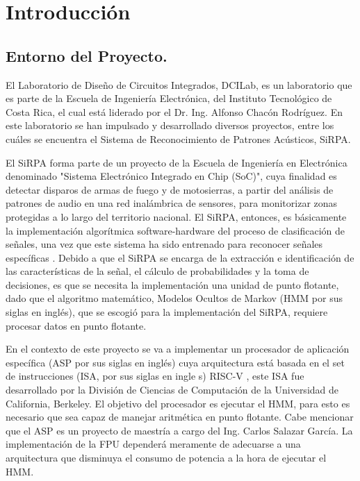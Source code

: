 
\chapter{Introducción}
\label{chp:intro}

\section{Entorno del Proyecto.}

El Laboratorio de Diseño de Circuitos Integrados, DCILab, es un laboratorio que es parte de la Escuela de Ingeniería Electrónica, del Instituto Tecnológico de Costa Rica, el cual está liderado por el Dr. Ing. Alfonso Chacón Rodríguez. En este laboratorio se han impulsado y desarrollado diversos proyectos, entre los cuáles se encuentra el Sistema de Reconocimiento de Patrones Acústicos, SiRPA.

El SiRPA forma parte de un proyecto de la Escuela de Ingeniería en Electrónica denominado  "Sistema Electrónico Integrado en Chip (SoC)", cuya finalidad es detectar disparos de armas de fuego y de motosierras, a partir del análisis de patrones de audio en una red inalámbrica de sensores, para monitorizar zonas protegidas a lo largo del territorio nacional. El SiRPA, entonces, es básicamente la implementación algorítmica software-hardware del proceso de clasificación de señales, una vez que este sistema ha sido entrenado para reconocer señales específicas \cite{SIRPA}. Debido a que el SiRPA se encarga de la extracción e identificación de las características de la señal, el cálculo de probabilidades y la toma de decisiones, es que se necesita la implementación una unidad de punto flotante, dado que el algoritmo matemático, Modelos Ocultos de Markov \cite{HMM} \cite{HMM2} (HMM por sus siglas en inglés), que se escogió para la implementación del SiRPA, requiere procesar datos en punto flotante.

En el contexto de este proyecto se va a implementar un procesador de aplicación específica (ASP por sus siglas en inglés) cuya arquitectura está basada en el set de instrucciones (ISA, por sus siglas en ingle s) RISC-V \cite{RISCV}, este ISA fue desarrollado por la División de Ciencias de Computación de la Universidad de California, Berkeley. El objetivo del procesador es ejecutar el HMM, para esto es necesario que sea capaz de manejar aritmética en punto flotante. Cabe mencionar que el ASP es un proyecto de maestría a cargo del Ing. Carlos Salazar García. La implementación de la FPU dependerá meramente de adecuarse a una arquitectura que disminuya el consumo de potencia a la hora de ejecutar el HMM.

